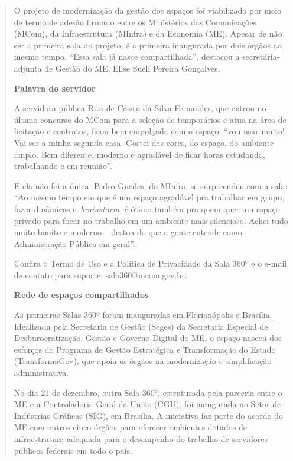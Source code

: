 \begin{quote}
O projeto de modernização da gestão dos espaços foi viabilizado por meio
de termo de adesão firmado entre os Ministérios das Comunicações (MCom),
da Infraestrutura (MInfra) e da Economia (ME). Apesar de não ser a
primeira sala do projeto, é a primeira inaugurada por dois órgãos ao
mesmo tempo. ``Essa sala já nasce compartilhada'', destacou a
secretária-adjunta de Gestão do ME, Elise Sueli Pereira Gonçalves.

\textbf{Palavra do servidor}

A servidora pública Rita de Cássia da Silva Fernandes, que entrou no
último concurso do MCom para a seleção de temporários e atua na área de
licitação e contratos, ficou bem empolgada com o espaço: ``vou usar
muito! Vai ser a minha segunda casa. Gostei das cores, do espaço, do
ambiente amplo. Bem diferente, moderno e agradável de ficar horas
estudando, trabalhando e em reunião''.

E ela não foi a única. Pedro Guedes, do MInfra, se surpreendeu com a
sala: ``Ao mesmo tempo em que é um espaço agradável pra trabalhar em
grupo, fazer dinâmicas e~\emph{brainstorm}, é ótimo também pra quem quer
um espaço privado para focar no trabalho em um ambiente mais silencioso.
Achei tudo muito bonito e moderno -- destoa do que a gente entende como
Administração Pública em geral''.

Confira o Termo de Uso e a Política de Privacidade da Sala 360º e o e-mail de contato
para
suporte: sala360@mcom.gov.br.

\textbf{Rede de espaços compartilhados}

As primeiras Salas 360º foram inauguradas em Florianópolis e Brasília.
Idealizada pela Secretaria de Gestão (Seges) da Secretaria Especial de
Desburocratização, Gestão e Governo Digital do ME, o espaço nasceu dos
esforços do Programa de Gestão Estratégica e Transformação do Estado
(TransformaGov), que apoia os órgãos na modernização e simplificação
administrativa.

No dia 21 de dezembro, outra Sala 360°, estruturada pela parceria entre
o ME e a Controladoria-Geral da União (CGU), foi inaugurada no Setor de
Indústrias Gráficas (SIG), em Brasília. A iniciativa faz parte do acordo
do ME com outros cinco órgãos para oferecer ambientes dotados de
infraestrutura adequada para o desempenho do trabalho de servidores
públicos federais em todo o país.

\end{quote}

